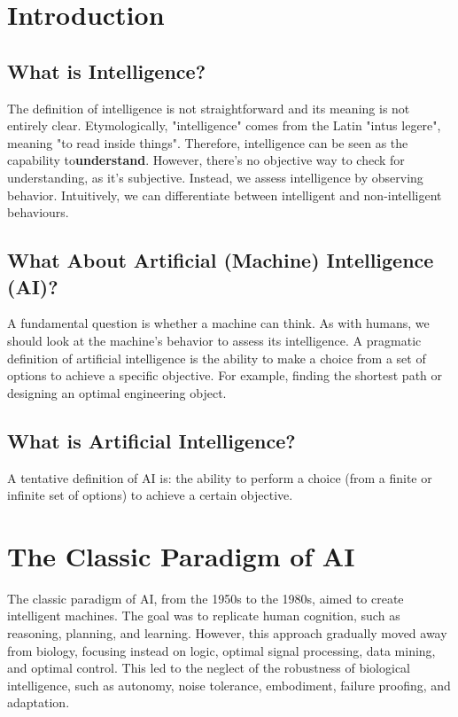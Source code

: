 \section{Introduction}

\subsection*{What is Intelligence?}
The definition of intelligence is not straightforward and its meaning is not entirely clear. Etymologically, "intelligence" comes from the Latin "intus legere", meaning "to read inside things". Therefore, intelligence can be seen as the capability to\textbf{understand}. However, there's no objective way to check for understanding, as it's subjective. Instead, we assess intelligence by observing behavior. Intuitively, we can differentiate between intelligent and non-intelligent behaviours.

\subsection*{What About Artificial (Machine) Intelligence (AI)?}
A fundamental question is whether a machine can think. As with humans, we should look at the machine's behavior to assess its intelligence.  A pragmatic definition of artificial intelligence is the ability to make a choice from a set of options to achieve a specific objective. For example, finding the shortest path or designing an optimal engineering object.

\subsection*{What is Artificial Intelligence?}
A tentative definition of AI is: the ability to perform a choice (from a finite or infinite set of options) to achieve a certain objective.

\section{The Classic Paradigm of AI}
The classic paradigm of AI, from the 1950s to the 1980s, aimed to create intelligent machines. The goal was to replicate human cognition, such as reasoning, planning, and learning. However, this approach gradually moved away from biology, focusing instead on logic, optimal signal processing, data mining, and optimal control. This led to the neglect of the robustness of biological intelligence, such as autonomy, noise tolerance, embodiment, failure proofing, and adaptation.


